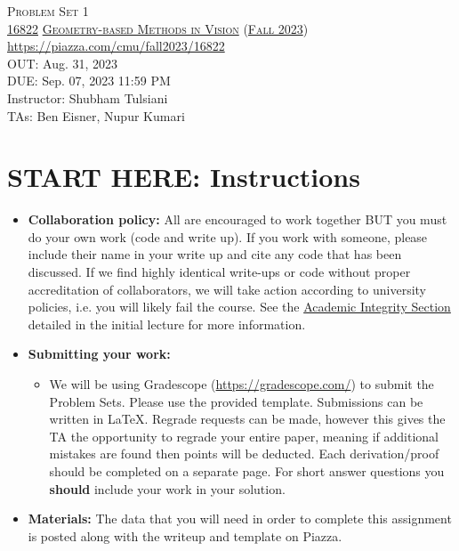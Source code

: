 \documentclass[11pt,addpoints,answers]{exam}
\title{\textsc{\hwName}} %
\author{}
\date{}
\date{}
\numberwithin{equation}{section} %
\numberwithin{figure}{section} %
\numberwithin{table}{section} %
\newcommand{\courseNum}{\href{https://geometric3d.github.io}{16822}}
\newcommand{\courseName}{\href{https://geometric3d.github.io}{Geometry-based Methods in Vision}}
\newcommand{\courseSem}{\href{https://geometric3d.github.io}{Fall 2023}}
\newcommand{\courseUrl}{\url{https://piazza.com/cmu/fall2023/16822}}
\newcommand{\hwNum}{Problem Set 1}
\newcommand{\hwTopic}{Linear Algebra }
\newcommand{\outDate}{Aug. 31, 2023}
\newcommand{\dueDate}{Sep. 07, 2023 11:59 PM}
\newcommand{\instructorName}{Shubham Tulsiani}
\newcommand{\taNames}{Ben Eisner, Nupur Kumari}
\begin{document}
\section*{}
\begin{center}
  \textsc{\LARGE \hwNum} \\
  \vspace{1em}
  \textsc{\large \courseNum{} \courseName{} (\courseSem)} \\
  \courseUrl\\
  \vspace{1em}
  OUT: \outDate \\
  DUE: \dueDate \\
  Instructor: \instructorName \\
  TAs: \taNames
\end{center}

\section*{START HERE: Instructions}
\begin{itemize}
\item \textbf{Collaboration policy:} All are encouraged to work together BUT you must do your own work (code and write up). If you work with someone, please include their name in your write up and cite any code that has been discussed. If we find highly identical write-ups or code without proper accreditation of collaborators, we will take action according to university policies, i.e. you will likely fail the course. See the \href{https://www.dropbox.com/s/z6o0tinc9eaez46/L01_Overview.pdf?dl=0}{Academic Integrity Section} detailed in the initial lecture for more information.


\item\textbf{Submitting your work:}

\begin{itemize}

\item We will be using Gradescope (\url{https://gradescope.com/}) to submit the Problem Sets. Please use the provided template. Submissions can be written in LaTeX. Regrade requests can be made, however this gives the TA the opportunity to regrade your entire paper, meaning if additional mistakes are found then points will be deducted.
Each derivation/proof should be  completed on a separate page. For short answer questions you \textbf{should} include your work in your solution.  
\end{itemize}

\item \textbf{Materials:} The data that you will need in order to complete this assignment is posted along with the writeup and template on Piazza.

\end{itemize}
\end{document}

